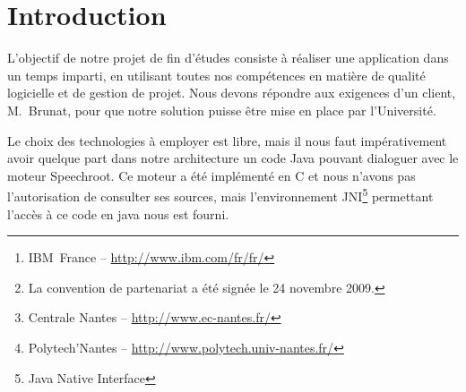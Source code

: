 \documentclass[a4paper,11pt]{report}
\begin{document}


\begin{abstract}
Le projet de fin d'études consiste en la mise en \oe{}uvre de compétences acquises au cours des deux années de Master.
Chaque groupe de quatre à six étudiants travaille sur un sujet de projet différent.
Le déroulement du projet doit respecter les étapes de création d'un véritable projet open-source et doit en conséquent tirer au maximum profit des différents outils de gestion de projet.

Le projet que nous avons choisi de réaliser a été proposé par l'entreprise IBM~France\footnote{IBM~France -- \url{http://www.ibm.com/fr/fr/}}.
Il s'agit du fruit d'un partenariat entre IBM et l'Université de Nantes\footnote{La convention de partenariat a été signée le 24 novembre 2009.} afin de faciliter la scolarisation des étudiants malentendants.
En effet, à l'aide d'un logiciel disposant d'un moteur de reconnaissance vocale (en l'occurrence le moteur ``Speechroot'' d'IBM), l'étudiant aurait accès au sous-titrage du discours de l'enseignant de manière immédiate.
Ce projet diffère légèrement des autres par le fait que nous devons travailler en collaboration avec des groupes d'étudiants de d'autres écoles.
L'équipe d'IBM, composée de Béatrice~Martin et de sa collègue Christel~Amato, technicienne ayant une très importante expérience dans le domaine de la reconnaissance vocale, se charge de la coordination entre les trois groupes d'étudiants (celui de Centrale\footnote{Centrale Nantes -- \url{http://www.ec-nantes.fr/}}, de Polytech'\footnote{Polytech'Nantes -- \url{http://www.polytech.univ-nantes.fr/}} et nous-mêmes) et Stéphane~Brunat du Relai Handicap.
\end{abstract}

\tableofcontents


\chapter*{Introduction}
L'objectif de notre projet de fin d'études consiste à réaliser une application dans un temps imparti, en utilisant toutes nos compétences en matière de qualité logicielle et de gestion de projet.
Nous devons répondre aux exigences d'un client, M.~Brunat, pour que notre solution puisse être mise en place par l'Université.

Le choix des technologies à employer est libre, mais il nous faut im\-pé\-ra\-ti\-ve\-ment avoir quelque part dans notre architecture un code Java pouvant dialoguer avec le moteur Speechroot.
Ce moteur a été implémenté en C et nous n'avons pas l'autorisation de consulter ses sources, mais l'environnement JNI\footnote{Java Native Interface} permettant l'accès à ce code en java nous est fourni.
\end{document}
